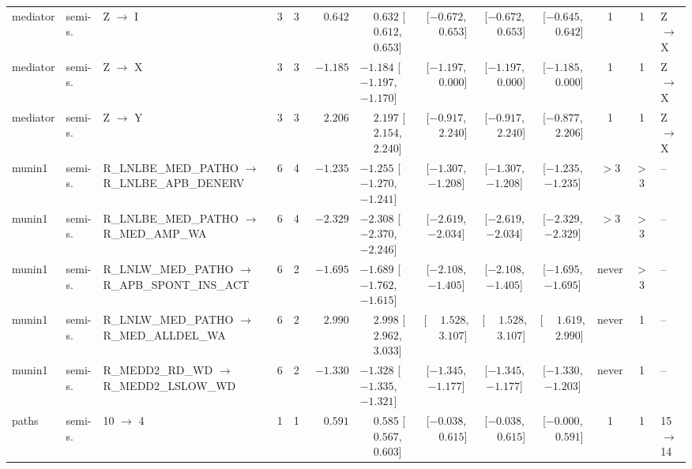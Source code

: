 \begin{landscape}
\begin{longtable}{@{}llp{2.15cm}ccrl cccc c l@{}}
mediator & semi-s. & Z $\to$ I & 3 & 3 & $\phantom{-}0.642$ & $\phantom{-}0.632$ [$\phantom{-}0.612$, $\phantom{-}0.653$] & [$-0.672$, $\phantom{-}0.653$] & [$-0.672$, $\phantom{-}0.653$] & [$-0.645$, $\phantom{-}0.642$] & 1 & 1 & Z$\to$X \\
mediator & semi-s. & Z $\to$ X & 3 & 3 & $-1.185$ & $-1.184$ [$-1.197$, $-1.170$] & [$-1.197$, $\phantom{-}0.000$] & [$-1.197$, $\phantom{-}0.000$] & [$-1.185$, $\phantom{-}0.000$] & 1 & 1 & Z$\to$X \\
mediator & semi-s. & Z $\to$ Y & 3 & 3 & $\phantom{-}2.206$ & $\phantom{-}2.197$ [$\phantom{-}2.154$, $\phantom{-}2.240$] & [$-0.917$, $\phantom{-}2.240$] & [$-0.917$, $\phantom{-}2.240$] & [$-0.877$, $\phantom{-}2.206$] & 1 & 1 & Z$\to$X \\
munin1 & semi-s. & R\_\allowbreak{}LNLBE\_\allowbreak{}MED\_\allowbreak{}PATHO $\to$ R\_\allowbreak{}LNLBE\_\allowbreak{}APB\_\allowbreak{}DENERV & 6 & 4 & $-1.235$ & $-1.255$ [$-1.270$, $-1.241$] & [$-1.307$, $-1.208$] & [$-1.307$, $-1.208$] & [$-1.235$, $-1.235$] & $>$3 & $>$3 & -- \\
munin1 & semi-s. & R\_\allowbreak{}LNLBE\_\allowbreak{}MED\_\allowbreak{}PATHO $\to$ R\_\allowbreak{}MED\_\allowbreak{}AMP\_\allowbreak{}WA & 6 & 4 & $-2.329$ & $-2.308$ [$-2.370$, $-2.246$] & [$-2.619$, $-2.034$] & [$-2.619$, $-2.034$] & [$-2.329$, $-2.329$] & $>$3 & $>$3 & -- \\
munin1 & semi-s. & R\_\allowbreak{}LNLW\_\allowbreak{}MED\_\allowbreak{}PATHO $\to$ R\_\allowbreak{}APB\_\allowbreak{}SPONT\_\allowbreak{}INS\_\allowbreak{}ACT & 6 & 2 & $-1.695$ & $-1.689$ [$-1.762$, $-1.615$] & [$-2.108$, $-1.405$] & [$-2.108$, $-1.405$] & [$-1.695$, $-1.695$] & never & $>$3 & -- \\
munin1 & semi-s. & R\_\allowbreak{}LNLW\_\allowbreak{}MED\_\allowbreak{}PATHO $\to$ R\_\allowbreak{}MED\_\allowbreak{}ALLDEL\_\allowbreak{}WA & 6 & 2 & $\phantom{-}2.990$ & $\phantom{-}2.998$ [$\phantom{-}2.962$, $\phantom{-}3.033$] & [$\phantom{-}1.528$, $\phantom{-}3.107$] & [$\phantom{-}1.528$, $\phantom{-}3.107$] & [$\phantom{-}1.619$, $\phantom{-}2.990$] & never & 1 & -- \\
munin1 & semi-s. & R\_\allowbreak{}MEDD2\_\allowbreak{}RD\_\allowbreak{}WD $\to$ R\_\allowbreak{}MEDD2\_\allowbreak{}LSLOW\_\allowbreak{}WD & 6 & 2 & $-1.330$ & $-1.328$ [$-1.335$, $-1.321$] & [$-1.345$, $-1.177$] & [$-1.345$, $-1.177$] & [$-1.330$, $-1.203$] & never & 1 & -- \\
paths & semi-s. & 10 $\to$ 4 & 1 & 1 & $\phantom{-}0.591$ & $\phantom{-}0.585$ [$\phantom{-}0.567$, $\phantom{-}0.603$] & [$-0.038$, $\phantom{-}0.615$] & [$-0.038$, $\phantom{-}0.615$] & [$-0.000$, $\phantom{-}0.591$] & 1 & 1 & 15$\to$14 \\

\end{longtable}
\end{landscape}
